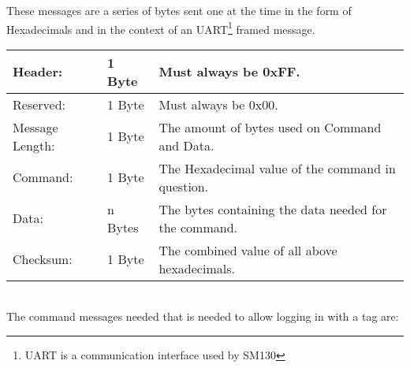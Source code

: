 These messages are a series of bytes sent one at the time in the form of Hexadecimals and in the context of an UART\footnote{UART is a communication interface used by SM130} framed message. \newline
\begin{tabular}{|l|l|p{7cm}|}
\hline \hline
Header: & 1 Byte & Must always be 0xFF.\\ \hline
Reserved: & 1 Byte & Must always be 0x00.\\ \hline
Message Length: & 1 Byte & The amount of bytes used on Command and Data.\\ \hline
Command: & 1 Byte & The Hexadecimal value of the command in question.\\ \hline
Data: & n Bytes & The bytes containing the data needed for the command.\\ \hline
Checksum: & 1 Byte & The combined value of all above hexadecimals.\\ \hline
\end{tabular} \\
The command messages needed that is needed to allow logging in with a tag are: 
